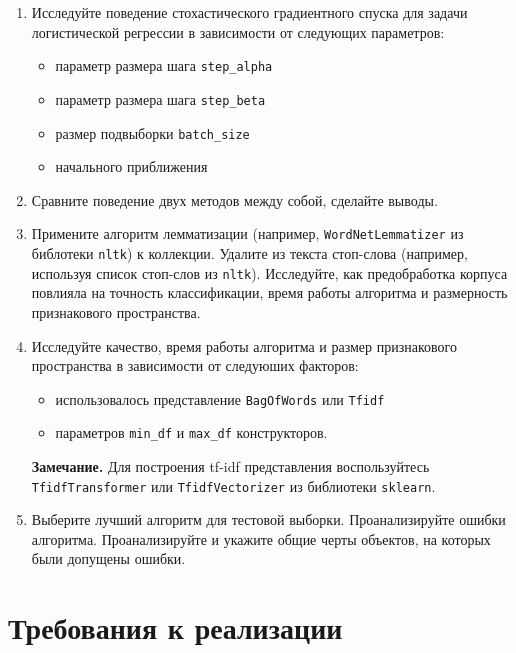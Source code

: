 \documentclass[10pt,fleqn]{article}
\begin{document}
\begin{enumerate}
    \item Исследуйте поведение стохастического градиентного спуска для задачи логистической регрессии в зависимости от следующих параметров:
    \begin{itemize}
        \item параметр размера шага \texttt{step\_alpha}
        \item параметр размера шага \texttt{step\_beta}
        \item размер подвыборки \texttt{batch\_size}
        \item начального приближения
    \end{itemize}


    \item Сравните поведение двух методов между собой, сделайте выводы.

    \item Примените алгоритм лемматизации (например,  \texttt{WordNetLemmatizer} из библотеки \texttt{nltk}) к коллекции. Удалите из текста стоп-слова (например, используя список стоп-слов из \texttt{nltk}). Исследуйте, как предобработка корпуса повлияла на точность классификации, время работы алгоритма и размерность признакового пространства.

    \item Исследуйте качество, время работы алгоритма и размер признакового пространства в зависимости от следуюших факторов:

    \begin{itemize}
        \item использовалось представление \verb|BagOfWords| или \verb|Tfidf|
        \item параметров \texttt{min\_df} и \texttt{max\_df} конструкторов.
    \end{itemize}

    \textbf{Замечание.} Для построения tf-idf представления воспользуйтесь \texttt{TfidfTransformer} или \texttt{TfidfVectorizer} из библиотеки \texttt{sklearn}.

    \item Выберите лучший алгоритм для тестовой выборки. Проанализируйте ошибки алгоритма. Проанализируйте и укажите общие черты объектов, на которых были допущены ошибки.

\end{enumerate}


\section*{Требования к реализации}
\end{document}
